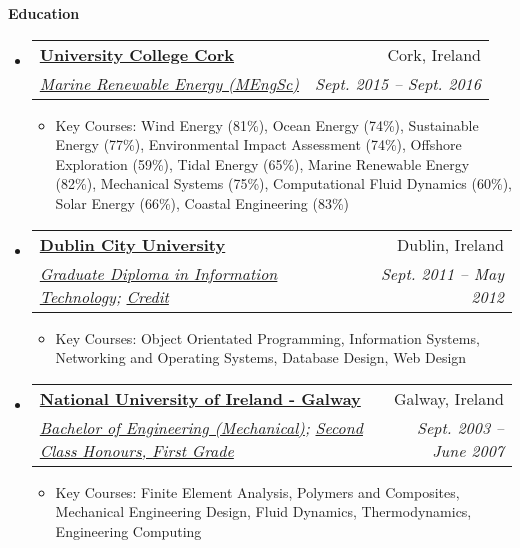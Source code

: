 \documentclass[letterpaper,11pt]{article}
\makeatletter
\newcommand{\resitem}[1]{\item #1 \vspace{-2pt}}
\newcommand{\resheading}[1]{{\large \colorbox{mygrey}{\begin{minipage}{\textwidth}{\textbf{#1 \vphantom{p\^{E}}}}\end{minipage}}}}
\newcommand{\ressubheading}[4]{
\begin{tabular*}{6.5in}{l@{\extracolsep{\fill}}r}
		\textbf{#1} & #2 \\
		\textit{#3} & \textit{#4} \\
\end{tabular*}\vspace{-6pt}}
\makeatother
\begin{document}
\resheading{Education}
	\begin{itemize}
    \item
      \ressubheading{\href{http://www.ucc.ie}{University College Cork}}{Cork, Ireland}{\href{http://www.ucc.ie/en/ckr51/}{Marine Renewable Energy (MEngSc)}}
      {Sept. 2015 -- Sept. 2016}
        { \footnotesize
        \begin{itemize}
        \resitem{Key Courses: Wind Energy (81\%), Ocean Energy (74\%), Sustainable Energy (77\%), Environmental Impact Assessment (74\%), Offshore Exploration (59\%), Tidal Energy (65\%), Marine Renewable Energy (82\%), Mechanical Systems (75\%), Computational Fluid Dynamics (60\%), Solar Energy (66\%), Coastal Engineering (83\%)}
        \end{itemize}
        }

    \item
      \ressubheading{\href{http://www.dcu.ie}{Dublin City University}}{Dublin, Ireland}{\href{https://www.dcu.ie/prospective/deginfo.php?classname=GDF\&originating_school=40}{Graduate Diploma in Information Technology};
      \href{http://peterarmstrong.ie/cv/grad_dip_it_transcript.pdf}{Credit}}
      {Sept. 2011 -- May 2012}
        { \footnotesize
        \begin{itemize}
        \resitem{Key Courses: Object Orientated Programming, Information Systems, Networking and Operating Systems, Database Design, Web Design}
        \end{itemize}
        }

		\item
			\ressubheading{\href{http://www.nuigalway.ie}{National University of Ireland - Galway}}{Galway, Ireland}
			{\href{http://www.nuigalway.ie/courses/undergraduate-courses/mechanical-engineering.html}{Bachelor of Engineering (Mechanical)}; 
			\href{http://peterarmstrong.ie/cv/mech_eng_transcript.jpg}{Second Class Honours, First Grade}}
      {Sept. 2003 -- June 2007}
				{ \footnotesize
				\begin{itemize}
					\resitem{Key Courses: Finite Element Analysis, Polymers and Composites, Mechanical Engineering Design, Fluid Dynamics, Thermodynamics, Engineering Computing }
				\end{itemize}
				}

	\end{itemize} %
\end{document}
